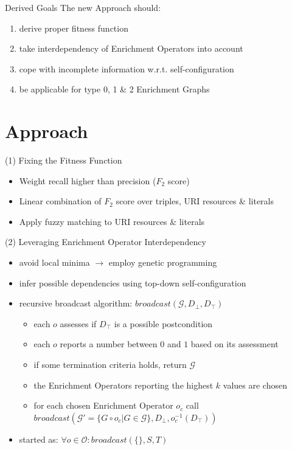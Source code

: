 \documentclass[aspectratio=1610]{beamer}
\begin{document}
\begin{frame}{Derived Goals}
  The new Approach should:
\begin{enumerate}
  \item derive proper fitness function
  \item take interdependency of Enrichment Operators into account
  \item cope with incomplete information w.r.t. self-configuration
  \item be applicable for type 0, 1 \& 2 Enrichment Graphs
\end{enumerate}
\end{frame}
\section{Approach}
\begin{frame}{(1) Fixing the Fitness Function}
    \begin{itemize}
      \item Weight recall higher than precision ($F_2$ score)
      \item Linear combination of $F_2$ score over triples, URI resources \& literals
      \item Apply fuzzy matching to URI resources \& literals
    \end{itemize}
\end{frame}

\begin{frame}{(2) Leveraging Enrichment Operator Interdependency}
    \begin{itemize}
      \item avoid local minima $\to$ employ genetic programming  
      \item infer possible dependencies using top-down self-configuration
      \item recursive broadcast algorithm: $\textit{broadcast}(\mathcal{G},D_{\bot},D_{\top})$
      \begin{itemize}
      \item each $o$ assesses if $D_{\top}$ is a possible postcondition
      \item each $o$ reports a number between $0$ and $1$ based on its assessment
      \item if some termination criteria holds, return $\mathcal{G}$
      \item the Enrichment Operators reporting the highest $k$ values are chosen
      \item for each chosen Enrichment Operator $o_c$ call $\textit{broadcast}(\mathcal{G'}=\{G \circ o_c |G\in\mathcal{G}\},D_{\bot},o_c^{-1}(D_{\top}))$
      \end{itemize}
      \item started as: $\forall o\in\mathcal{O}: \textit{broadcast}(\{\},S,T)$
    \end{itemize}
\end{frame}
\end{document}
